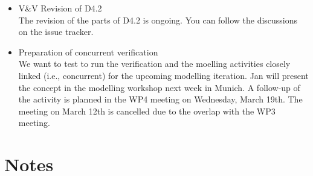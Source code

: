 \documentclass[a4paper, 11pt]{article}
\begin{document}
\begin{itemize}
\item V\&V Revision of D4.2\\
The revision of the parts of D4.2 is ongoing. You can follow the discussions on the issue tracker.

\item Preparation of concurrent verification\\
We want to test to run the verification and the moelling activities closely linked (i.e., concurrent) for the upcoming modelling iteration.
Jan will present the concept in the modelling workshop next week in Munich. A follow-up of the activity is planned in the WP4 meeting on Wednesday, March 19th. The meeting on March 12th is cancelled due to the overlap with the WP3 meeting.

\end{itemize}


\section{Notes}
\end{document}
